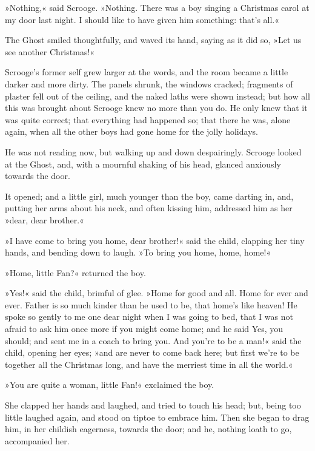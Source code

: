 »Nothing,« said Scrooge. »Nothing. There was a boy singing a Christmas carol at my door last night. I should like to have given him something: that's all.«

The Ghost smiled thoughtfully, and waved its hand, saying as it did so, »Let us see another Christmas!«

Scrooge's former self grew larger at the words, and the room became a little darker and more dirty. The panels shrunk, the windows cracked; fragments of plaster fell out of the ceiling, and the naked laths were shown instead; but how all this was brought about Scrooge knew no more than you do. He only knew that it was quite correct; that everything had happened so; that there he was, alone again, when all the other boys had gone home for the jolly holidays.

He was not reading now, but walking up and down despairingly. Scrooge looked at the Ghost, and, with a mournful shaking of his head, glanced anxiously towards the door.

It opened; and a little girl, much younger than the boy, came darting in, and, putting her arms about his neck, and often kissing him, addressed him as her »dear, dear brother.«

»I have come to bring you home, dear brother!« said the child, clapping her tiny hands, and bending down to laugh. »To bring you home, home, home!«

»Home, little Fan?« returned the boy.

»Yes!« said the child, brimful of glee. »Home for good and all. Home for ever and ever. Father is so much kinder than he used to be, that home's like heaven! He spoke so gently to me one dear night when I was going to bed, that I was not afraid to ask him once more if you might come home; and he said Yes, you should; and sent me in a coach to bring you. And you're to be a man!« said the child, opening her eyes; »and are never to come back here; but first we're to be together all the Christmas long, and have the merriest time in all the world.«

»You are quite a woman, little Fan!« exclaimed the boy.

She clapped her hands and laughed, and tried to touch his head; but, being too little laughed again, and stood on tiptoe to embrace him. Then she began to drag him, in her childish eagerness, towards the door; and he, nothing loath to go, accompanied her.

